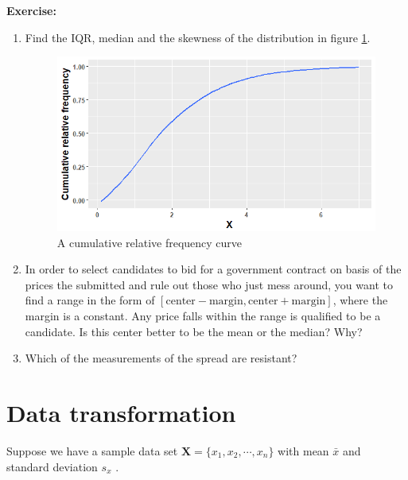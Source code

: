 \documentclass[a4paper, 12pt,twoside]{book}
\begin{document}
\colorbox{champagne}{\parbox{13.2cm}{
\textbf{Exercise:}\vspace{0.3cm}\\
\begin{enumerate}[(1)]
\item 
Find the IQR, median and the skewness of the distribution in figure \ref{Exercise1}.
\begin{figure}[H]
\centering
\includegraphics[scale=0.5]{CumulativeSkew.png}
\caption{A cumulative relative frequency curve}
\label{Exercise1}
\end{figure}
\vspace{2cm}

\item In order to select candidates to bid for a government contract on basis of the prices the submitted and rule out those who just mess around, you want to find a range in the form of $[\text{center}-\text{margin}, \text{center}+\text{margin}]$, where the margin is a constant. Any price falls within the range is qualified to be a candidate. Is this center better to be the mean or the median? Why? \vspace{3cm}\\
\item 
Which of the measurements of the spread are resistant?\vspace{2cm}
\end{enumerate}
}}
\newpage
\section{Data transformation}

Suppose we have a sample data set $\mathbf{X} = \{x_1, x_2, \cdots, x_n\}$ with mean $\bar{x}$ and standard deviation $s_x$ . 
\end{document}

